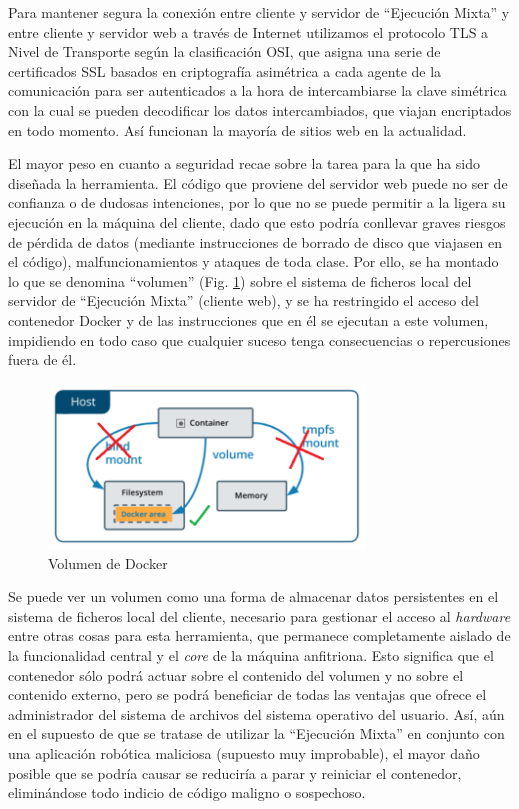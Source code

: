 Para mantener segura la conexión entre cliente y servidor de ``Ejecución Mixta'' y entre cliente y servidor web a través de Internet utilizamos el protocolo TLS a Nivel de Transporte según la clasificación OSI, que asigna una serie de certificados SSL basados en criptografía asimétrica a cada agente de la comunicación para ser autenticados a la hora de intercambiarse la clave simétrica con la cual se pueden decodificar los datos intercambiados, que viajan encriptados en todo momento. Así funcionan la mayoría de sitios web en la actualidad.

El mayor peso en cuanto a seguridad recae sobre la tarea para la que ha sido diseñada la herramienta. El código que proviene del servidor web puede no ser de confianza o de dudosas intenciones, por lo que no se puede permitir a la ligera su ejecución en la máquina del cliente, dado que esto podría conllevar graves riesgos de pérdida de datos (mediante instrucciones de borrado de disco que viajasen en el código), malfuncionamientos y ataques de toda clase. Por ello, se ha montado lo que se denomina ``volumen'' (Fig. \ref{volumen}) sobre el sistema de ficheros local del servidor de ``Ejecución Mixta'' (cliente web), y se ha restringido el acceso del contenedor Docker y de las instrucciones que en él se ejecutan a este volumen, impidiendo en todo caso que cualquier suceso tenga consecuencias o repercusiones fuera de él. 

\begin{figure}[!hbtp]  \centering\noindent
    \includegraphics[width=0.75\textwidth]{figures/volumen.png}
    \caption{Volumen de Docker}
    \label{volumen}
\end{figure}

Se puede ver un volumen como una forma de almacenar datos persistentes en el sistema de ficheros local del cliente, necesario para gestionar el acceso al \textit{hardware} entre otras cosas para esta herramienta, que permanece completamente aislado de la funcionalidad central y el \textit{core} de la máquina anfitriona. Esto significa que el contenedor sólo podrá actuar sobre el contenido del volumen y no sobre el contenido externo, pero se podrá beneficiar de todas las ventajas que ofrece el administrador del sistema de archivos del sistema operativo del usuario. Así, aún en el supuesto de que se tratase de utilizar la ``Ejecución Mixta'' en conjunto con una aplicación robótica maliciosa (supuesto muy improbable), el mayor daño posible que se podría causar se reduciría a parar y reiniciar el contenedor, eliminándose todo indicio de código maligno o sospechoso.

